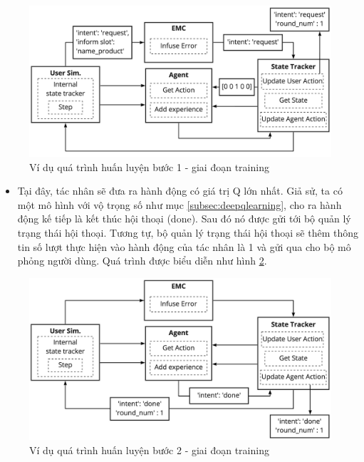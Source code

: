 \begin{center}
    \begin{figure}[h!]
        \begin{center}
         \includegraphics[scale=0.15]{chapter4/img/training_exam.jpg}
        \end{center}
        \caption{Ví dụ quá trình huấn luyện bước 1 - giai đoạn training}
        \label{fig:examtraining}
    \end{figure}
\end{center}

\begin{itemize}
    \item Tại đây, tác nhân sẽ đưa ra hành động có giá trị Q lớn nhất. Giả sử, ta có một mô hình với vộ trọng số như mục \ref{subsec:deepqlearning}, cho ra hành động kế tiếp là kết thúc hội thoại (done). Sau đó nó được gửi tới bộ quản lý trạng thái hội thoại. Tương tự, bộ quản lý trạng thái hội thoại sẽ thêm thông tin số lượt thực hiện vào hành động của tác nhân là 1 và gửi qua cho bộ mô phỏng người dùng. Quá trình được biểu diễn như hình \ref{fig:examtraining1}.
\end{itemize}

\begin{center}
    \begin{figure}[h!]
        \begin{center}
         \includegraphics[scale=0.16]{chapter4/img/training_exam1.jpg}
        \end{center}
        \caption{Ví dụ quá trình huấn luyện bước 2 - giai đoạn training}
        \label{fig:examtraining1}
    \end{figure}
\end{center}

